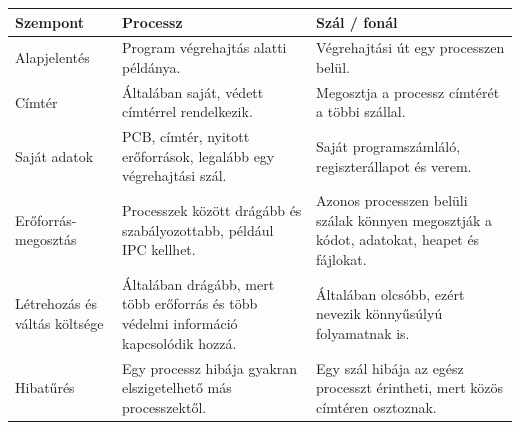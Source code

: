 \begin{tabularx}{\textwidth}{L{32mm}X X}
\toprule
\textbf{Szempont} & \textbf{Processz} & \textbf{Szál / fonál} \\
\midrule
Alapjelentés & Program végrehajtás alatti példánya. & Végrehajtási út egy processzen belül. \\
Címtér & Általában saját, védett címtérrel rendelkezik. & Megosztja a processz címtérét a többi szállal. \\
Saját adatok & PCB, címtér, nyitott erőforrások, legalább egy végrehajtási szál. & Saját programszámláló, regiszterállapot és verem. \\
Erőforrás-megosztás & Processzek között drágább és szabályozottabb, például IPC kellhet. & Azonos processzen belüli szálak könnyen megosztják a kódot, adatokat, heapet és fájlokat. \\
Létrehozás és váltás költsége & Általában drágább, mert több erőforrás és több védelmi információ kapcsolódik hozzá. & Általában olcsóbb, ezért nevezik könnyűsúlyú folyamatnak is. \\
Hibatűrés & Egy processz hibája gyakran elszigetelhető más processzektől. & Egy szál hibája az egész processzt érintheti, mert közös címtéren osztoznak. \\
\bottomrule
\end{tabularx}
